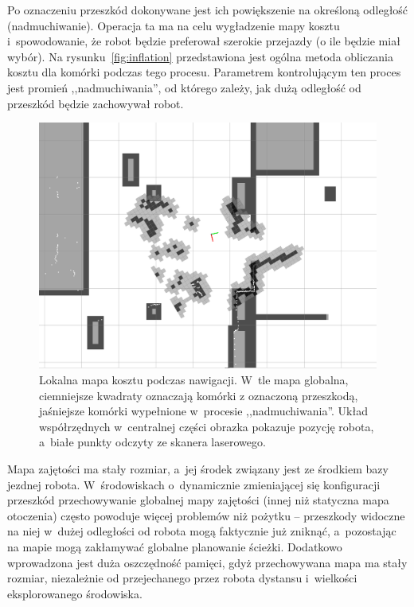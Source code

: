 Po oznaczeniu przeszkód dokonywane jest ich powiększenie na określoną odległość
(nadmuchiwanie). Operacja ta ma na celu wygładzenie mapy kosztu i~spowodowanie,
że robot będzie preferował szerokie przejazdy (o ile będzie miał wybór). Na
rysunku~\ref{fig:inflation} przedstawiona jest ogólna metoda obliczania kosztu
dla komórki podczas tego procesu. Parametrem kontrolującym ten proces jest
promień ,,nadmuchiwania'', od którego zależy, jak dużą odległość od
przeszkód będzie zachowywał robot.

\begin{figure}[htb!]
\centering
\includegraphics[width=13cm]{../img/costmap}
\caption[Mapa kosztu]{Lokalna mapa kosztu podczas nawigacji. W~tle mapa globalna, ciemniejsze
kwadraty oznaczają komórki z oznaczoną przeszkodą, jaśniejsze komórki wypełnione
w~procesie ,,nadmuchiwania''. Układ współrzędnych w~centralnej części obrazka pokazuje
pozycję robota, a~białe punkty odczyty ze skanera laserowego.}
\label{fig:costmap}
\end{figure}

Mapa zajętości ma stały rozmiar, a~jej środek związany jest ze środkiem bazy
jezdnej robota. W~środowiskach o~dynamicznie zmieniającej się konfiguracji
przeszkód przechowywanie globalnej mapy zajętości (innej niż statyczna mapa
otoczenia) często powoduje więcej problemów niż pożytku -- przeszkody widoczne
na niej w~dużej odległości od robota mogą faktycznie już zniknąć, a~pozostając
na mapie mogą zakłamywać globalne planowanie ścieżki. Dodatkowo wprowadzona jest
duża oszczędność pamięci, gdyż przechowywana mapa ma stały rozmiar, niezależnie
od przejechanego przez robota dystansu i~wielkości eksplorowanego środowiska.

